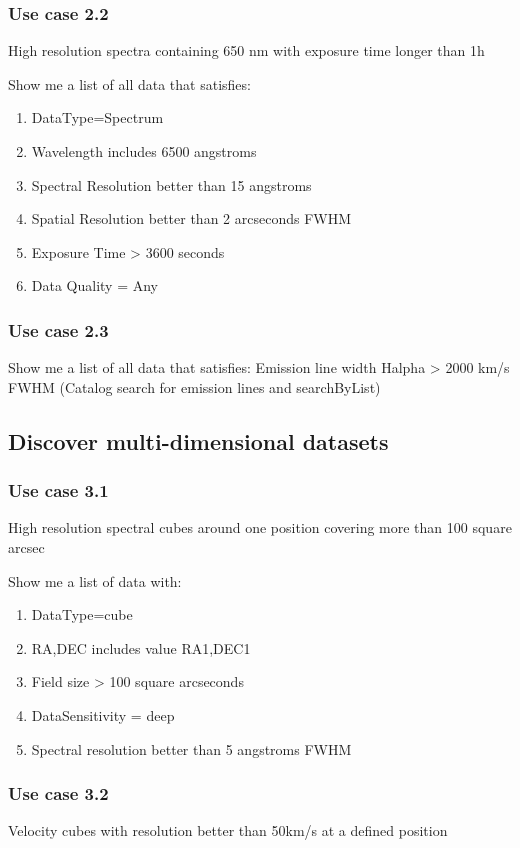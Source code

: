 \documentclass[11pt,a4paper]{ivoa}
\begin{document}
\subsubsection{Use case 2.2}
High resolution spectra containing 650 nm with exposure time longer than 1h

Show me a list of all data that satisfies:

\begin{enumerate}
\item DataType=Spectrum
\item Wavelength includes 6500 angstroms
\item Spectral Resolution better than 15 angstroms
\item Spatial Resolution better than 2 arcseconds FWHM
\item Exposure Time {\textgreater} 3600 seconds
\item Data Quality = Any
\end{enumerate}
\subsubsection{Use case 2.3}
Show me a list of all data that satisfies: Emission line width Halpha {\textgreater} 2000 km/s FWHM (Catalog search for
emission lines and searchByList)

\subsection{Discover multi-dimensional datasets}
\subsubsection{Use case 3.1}
High resolution spectral cubes around one position covering more than 100 square arcsec

Show me a list of data with:

\begin{enumerate}
\item DataType=cube
\item RA,DEC includes value RA1,DEC1
\item Field size {\textgreater} 100 square arcseconds
\item DataSensitivity = deep
\item Spectral resolution better than 5 angstroms FWHM
\end{enumerate}
\subsubsection{Use case 3.2}
Velocity cubes with resolution better than 50km/s at a defined position
\end{document}
